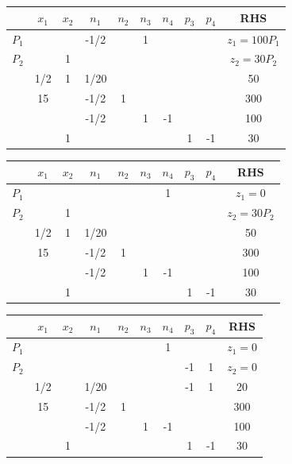 \documentclass[answers]{exam}
\begin{document}
\begin{questions}
\begin{solution}
\begin{parts}
		\begin{tabular}{cccccccccc}
			& $x_1$ & $x_2$ & $n_1$ & $n_2$ & $n_3$ & $n_4$ & $p_3$ & $p_4$ & RHS          \\ \hline
			$P_1$ &       &       & -1/2  &       & 1     &       &       &       & $z_1=100P_1$ \\
			$P_2$ &       & 1     &       &       &       &       &       &       & $z_2=30P_2$  \\ \hline
			& 1/2   & 1     & 1/20  &       &       &       &       &       & 50           \\
			& 15    &       & -1/2  & 1     &       &       &       &       & 300          \\
			&       &       & -1/2  &       & 1     & -1    &       &       & 100          \\
			&       & 1     &       &       &       &       & 1     & -1    & 30          
		\end{tabular}
		
		\begin{tabular}{cccccccccc}
			& $x_1$ & $x_2$ & $n_1$ & $n_2$ & $n_3$ & $n_4$ & $p_3$ & $p_4$ & RHS         \\ \hline
			$P_1$ &       &       &       &       &       & 1     &       &       & $z_1=0$     \\
			$P_2$ &       & 1     &       &       &       &       &       &       & $z_2=30P_2$ \\ \hline
			& 1/2   & 1     & 1/20  &       &       &       &       &       & 50          \\
			& 15    &       & -1/2  & 1     &       &       &       &       & 300         \\
			&       &       & -1/2  &       & 1     & -1    &       &       & 100         \\
			&       & 1     &       &       &       &       & 1     & -1    & 30         
		\end{tabular}
		
		\begin{tabular}{cccccccccc}
			& $x_1$ & $x_2$ & $n_1$ & $n_2$ & $n_3$ & $n_4$ & $p_3$ & $p_4$ & RHS     \\ \hline
			$P_1$ &       &       &       &       &       & 1     &       &       & $z_1=0$ \\
			$P_2$ &       &       &       &       &       &       & -1    & 1     & $z_2=0$ \\ \hline
			& 1/2   &       & 1/20  &       &       &       & -1    & 1     & 20      \\
			& 15    &       & -1/2  & 1     &       &       &       &       & 300     \\
			&       &       & -1/2  &       & 1     & -1    &       &       & 100     \\
			&       & 1     &       &       &       &       & 1     & -1    & 30     
		\end{tabular}
		

\end{parts}
\end{solution}
\end{questions}
\end{document}
